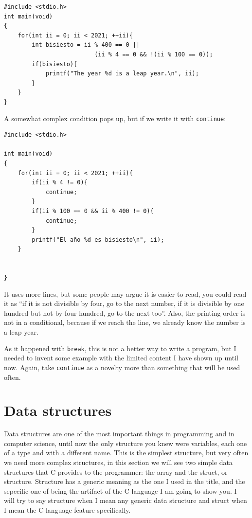 \documentclass[a4paper]{article}
\begin{document}
\noindent
\begin{minipage}[H]{\linewidth}
\mbox{}
\begin{lstlisting}[style=C,
caption={Example of algorithm of leap year},
label={lst:lapExample}]
#include <stdio.h>
int main(void)
{
    for(int ii = 0; ii < 2021; ++ii){
        int bisiesto = ii % 400 == 0 ||
                          (ii % 4 == 0 && !(ii % 100 == 0));
        if(bisiesto){
            printf("The year %d is a leap year.\n", ii);
        }
    }
}
\end{lstlisting}
\end{minipage}

A somewhat complex condition pops up, but if we write it with \texttt{continue}:

\noindent
\begin{minipage}[H]{\linewidth}
\mbox{}
\begin{lstlisting}[style=C,
caption={Example of algorithm with continue},
label={lst:continueExample}]
#include <stdio.h>

int main(void)
{
    for(int ii = 0; ii < 2021; ++ii){
        if(ii % 4 != 0){
            continue;
        }
        if(ii % 100 == 0 && ii % 400 != 0){
            continue;
        }
        printf("El año %d es bisiesto\n", ii);
    }


}
\end{lstlisting}
\end{minipage}

It uses more lines, but some people may argue it is easier to read, you could
read it as ``if it is not divisible by four, go to the next number, if it is
divisible by one hundred but not by four hundred, go to the next too''.
Also, the printing order is not in a conditional, because if we reach the line,
we already know the number is a leap year.

As it happened with \texttt{break}, this is not a better way to write a program,
but I needed to invent some example with the limited content I have shown up
until now. Again, take \texttt{continue} as a novelty more than something that
will be used often.
\section{Data structures}
Data structures are one of the most important things in programming and
in computer science, until now the only structure you knew were variables, each
one of a type and with a different name. This is the simplest structure, but
very often we need more complex structures, in this section we will see two
simple data structures that C provides to the programmer: the array and
the struct, or structure. Structure has a generic meaning as the one I used in
the title, and the sepecific one of being the artifact of the C language I am
going to show you. I will try to say structure when I mean any generic data
structure and struct when I mean the C language feature specifically.
\end{document}
